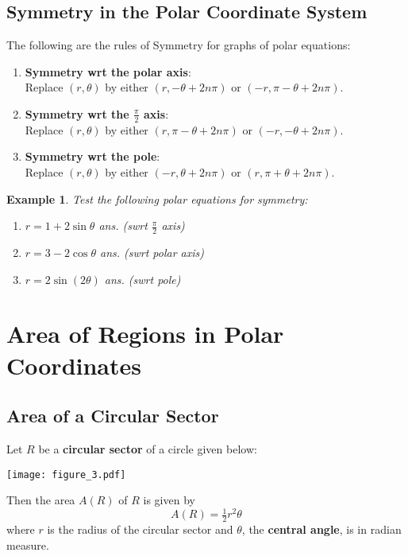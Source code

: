 \documentclass[12pt,twoside]{article}
\newtheorem{example}[theorem]{\bf Example}
\begin{document}
\subsection{Symmetry in the Polar Coordinate System}

The following are the rules of Symmetry for graphs of polar equations:
\begin{enumerate}
\item {\color{red}\bf Symmetry wrt the polar axis}:\\
Replace $(r,\theta)$ by either $(r,-\theta+2n\pi)$ or $(-r,\pi-\theta+2n\pi)$.
\item {\color{red}\bf Symmetry wrt the $\frac{\pi}{2}$ axis}:\\
Replace $(r,\theta)$ by either $(r,\pi-\theta+2n\pi)$ or $(-r,-\theta+2n\pi)$.
\item {\color{red}\bf Symmetry wrt the pole}:\\
Replace $(r,\theta)$ by either $(-r,\theta+2n\pi)$ or $(r,\pi+\theta+2n\pi)$.
\end{enumerate}

\begin{example}\rm
Test the following polar equations for symmetry:
\begin{enumerate}
\item $r=1+2\sin\theta$ \hfill ans. (swrt $\frac{\pi}{2}$ axis)
\item $r=3-2\cos\theta$ \hfill ans. (swrt polar axis)
\item $r=2\sin(2\theta)$ \hfill ans. (swrt pole)
\end{enumerate}
\end{example}


\section{Area of Regions in Polar Coordinates}

\subsection{Area of a Circular Sector}

Let $R$ be a {\bf circular sector} of a circle given below:
\begin{center}
\texttt{[image: figure\_3.pdf]}
\end{center}

Then the area $A(R)$ of $R$ is given by
$$A(R)=\tfrac{1}{2}r^2\theta$$
where
$r$ is the radius of the circular sector and $\theta$, the {\bf central angle}, is in radian measure.
\end{document}
